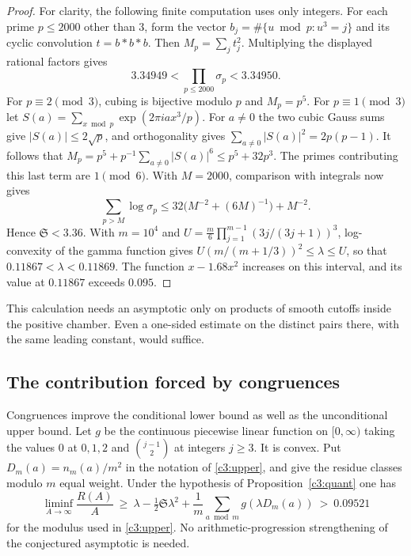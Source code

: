 \documentclass[11pt,letterpaper]{article}
\theoremstyle{definition}
\begin{document}
\begin{proof}
For clarity, the following finite computation uses only integers. For
each prime $p\le2000$ other than $3$, form the vector
$b_j=\#\{u\bmod p:u^3=j\}$ and its cyclic convolution
$t=b*b*b$. Then $M_p=\sum_j t_j^2$. Multiplying the displayed rational
factors gives
\[
 3.34949<\prod_{p\le2000}\sigma_p<3.34950.
\]
For $p\equiv2\pmod3$, cubing is bijective modulo $p$ and $M_p=p^5$.
For $p\equiv1\pmod3$ let $S(a)=\sum_{x\bmod p}\exp(2\pi i ax^3/p)$.
For $a\ne0$ the two cubic Gauss sums give $|S(a)|\le2\sqrt p$, and
orthogonality gives $\sum_{a\ne0}|S(a)|^2=2p(p-1)$.
It follows that $M_p=p^5+p^{-1}\sum_{a\ne0}|S(a)|^6\le p^5+32p^3$.
The primes contributing this last term are $1\pmod6$. With $M=2000$,
comparison with integrals now gives
\[
 \sum_{p>M}\log\sigma_p
 \le 32\bigl(M^{-2}+(6M)^{-1}\bigr)+M^{-2}.
\]
Hence $\mathfrak S<3.36$. With $m=10^4$ and
$U=\tfrac m6\prod_{j=1}^{m-1}(3j/(3j+1))^3$, log-convexity of the gamma
function gives $U(m/(m+1/3))^2\le\lambda\le U$, so that
$0.11867<\lambda<0.11869$.
The function $x-1.68x^2$ increases on this interval, and its value at
$0.11867$ exceeds $0.095$.
\end{proof}

This calculation needs an asymptotic only on products of smooth cutoffs
inside the positive chamber. Even a one-sided estimate on the distinct
pairs there, with the same leading constant, would suffice.

\subsection{The contribution forced by congruences}
\label{c3:congruence-surplus}
Congruences improve the conditional lower bound as well as the
unconditional upper bound. Let $g$ be the continuous piecewise linear
function on $[0,\infty)$ taking the values $0$ at $0,1,2$ and
$\binom{j-1}{2}$ at integers $j\ge3$. It is convex.
Put $D_m(a)=n_m(a)/m^2$ in the notation of
\eqref{c3:upper}, and give the residue classes modulo $m$ equal weight.
Under the hypothesis of Proposition~\ref{c3:quant} one has
\begin{equation}\label{c3:surplus-bound}
 \liminf_{A\to\infty}\frac{R(A)}{A}
 \ \ge\ \lambda-\tfrac12\mathfrak S\lambda^2+
                       \frac1m\sum_{a\bmod m}g(\lambda D_m(a))
 \ >\ 0.09521
\end{equation}
for the modulus used in \eqref{c3:upper}. No arithmetic-progression
strengthening of the conjectured asymptotic is needed.
\end{document}
